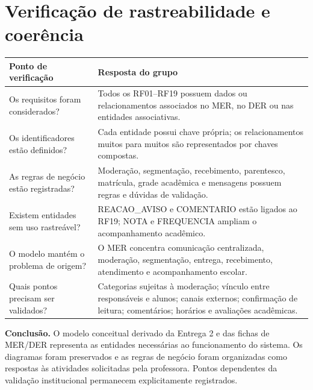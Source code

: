 \section{Verificação de rastreabilidade e coerência}
\begin{table}[!ht]\centering\small\renewcommand{\arraystretch}{1.5}
\begin{tabularx}{\linewidth}{|>{\raggedright\arraybackslash}p{4cm}|>{\raggedright\arraybackslash}X|}
\hline
\textbf{Ponto de verificação} & \textbf{Resposta do grupo} \\
\hline
Os requisitos foram considerados? & Todos os RF01--RF19 possuem dados ou relacionamentos associados no MER, no DER ou nas entidades associativas. \\
\hline
Os identificadores estão definidos? & Cada entidade possui chave própria; os relacionamentos muitos para muitos são representados por chaves compostas. \\
\hline
As regras de negócio estão registradas? & Moderação, segmentação, recebimento, parentesco, matrícula, grade acadêmica e mensagens possuem regras e dúvidas de validação. \\
\hline
Existem entidades sem uso rastreável? & REACAO\_AVISO e COMENTARIO estão ligados ao RF19; NOTA e FREQUENCIA ampliam o acompanhamento acadêmico. \\
\hline
O modelo mantém o problema de origem? & O MER concentra comunicação centralizada, moderação, segmentação, entrega, recebimento, atendimento e acompanhamento escolar. \\
\hline
Quais pontos precisam ser validados? & Categorias sujeitas à moderação; vínculo entre responsáveis e alunos; canais externos; confirmação de leitura; comentários; horários e avaliações acadêmicas. \\
\hline
\end{tabularx}
\end{table}

\begin{objectives}
\textbf{Conclusão.} O modelo conceitual derivado da Entrega 2 e das fichas de MER/DER representa
as entidades necessárias ao funcionamento do sistema. Os diagramas foram preservados e as regras
de negócio foram organizadas como respostas às atividades solicitadas pela professora.
Pontos dependentes da validação institucional permanecem explicitamente registrados.
\end{objectives}
